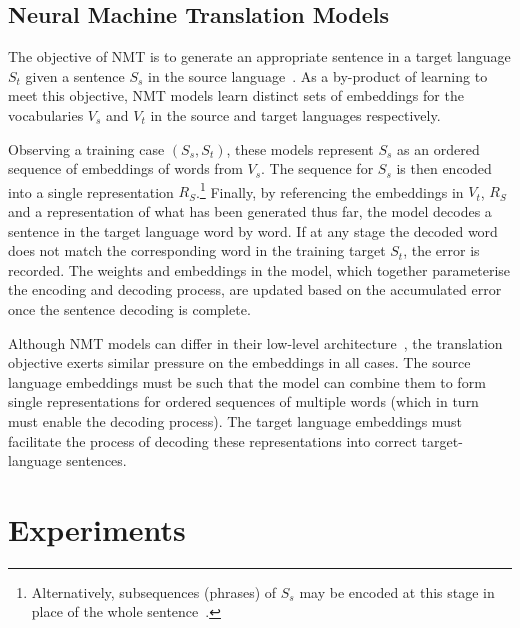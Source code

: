 \documentclass{article} %
\begin{document}
\subsection{Neural Machine Translation Models}

The objective of NMT is to generate an appropriate sentence in a target
language \(S_t\)  given a sentence \(S_s\) in the source language~\citep[see,
e.g.,][]{kalchbrenner13emnlp,Sutskever2014sequence}. As a by-product of learning to meet this objective, NMT models learn distinct sets of embeddings for the vocabularies \(V_ s\) and \(V_t\) in the source and target languages respectively.

Observing a training case \((S_s, S_t)\), these models represent \(S_s\) as an ordered sequence of embeddings of words from \(V_s\). The sequence for \(S_s\) is then encoded into a single representation \(R_S\).\footnote{Alternatively, subsequences (phrases) of \(S_s\) may be encoded at this stage in place of the whole sentence~\citep{Bahdanau2014}.} Finally, by referencing the embeddings in \(V_t\), \(R_S\) and a representation of what has been generated thus far, the model decodes a sentence in the target language word by word. If at any stage the decoded word does not match the corresponding word in the training target \(S_t\), the error is recorded. The weights and embeddings in the model, which together parameterise the encoding and decoding process, are updated based on the accumulated error once the sentence decoding is complete. 

Although NMT models can differ in their low-level architecture~\citep{kalchbrenner13emnlp,Cho2014,Bahdanau2014}, the translation objective exerts similar pressure on the embeddings in all cases. The source language embeddings must be such that the model can combine them to form single representations for ordered sequences of multiple words (which in turn must enable the decoding process). The target language embeddings must facilitate the process of decoding these representations into correct target-language sentences.    

\section{Experiments}
\end{document}
